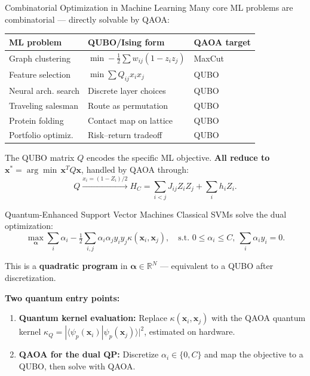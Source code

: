 \documentclass{beamer}
\begin{document}
\begin{frame}

\begin{frame}{Combinatorial Optimization in Machine Learning}
Many core ML problems are combinatorial — directly solvable by QAOA:

\medskip

\begin{center}
\small
\begin{tabular}{lll}
\hline
\textbf{ML problem} & \textbf{QUBO/Ising form} & \textbf{QAOA target} \\
\hline
Graph clustering & $\min -\tfrac{1}{2}\sum w_{ij}(1-z_iz_j)$ & MaxCut \\
Feature selection & $\min \sum Q_{ij}x_ix_j$ & QUBO \\
Neural arch. search & Discrete layer choices & QUBO \\
Traveling salesman & Route as permutation & QUBO \\
Protein folding & Contact map on lattice & QUBO \\
Portfolio optimiz. & Risk–return tradeoff & QUBO \\
\hline
\end{tabular}
\end{center}

\medskip

The QUBO matrix $Q$ encodes the specific ML objective.
\textbf{All reduce to} $\mathbf{x}^*=\arg\min\,\mathbf{x}^TQ\mathbf{x}$,
handled by QAOA through:
\[
Q \xrightarrow{x_i=(1-Z_i)/2} H_C = \sum_{i<j}J_{ij}Z_iZ_j+\sum_i h_iZ_i.
\]
\end{frame}


\begin{frame}{Quantum-Enhanced Support Vector Machines}
Classical SVMs solve the dual optimization:
\[
\max_{\boldsymbol{\alpha}}\sum_i\alpha_i
- \tfrac{1}{2}\sum_{i,j}\alpha_i\alpha_j y_iy_j\kappa(\mathbf{x}_i,\mathbf{x}_j),
\quad
\text{s.t. } 0\le\alpha_i\le C,\ \sum_i\alpha_iy_i=0.
\]

This is a \textbf{quadratic program} in $\boldsymbol{\alpha}\in\mathbb{R}^N$ —
equivalent to a QUBO after discretization.

\medskip

\textbf{Two quantum entry points:}
\begin{enumerate}
\item \textbf{Quantum kernel evaluation:}  Replace $\kappa(\mathbf{x}_i,\mathbf{x}_j)$
  with the QAOA quantum kernel
  $\kappa_Q = |\langle\psi_p(\mathbf{x}_i)|\psi_p(\mathbf{x}_j)\rangle|^2$,
  estimated on hardware.
\item \textbf{QAOA for the dual QP:}  Discretize $\alpha_i\in\{0,C\}$
  and map the objective to a QUBO, then solve with QAOA.
\end{enumerate}


\end{frame}
\end{frame}
\end{document}
